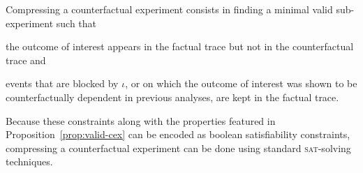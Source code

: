 \noindent Compressing a counterfactual experiment consists in finding
a minimal valid sub-experiment such that
\begin{inparaenum}[(i)]
\item the outcome of interest appears in the factual trace but not in
  the counterfactual trace and
\item events that are blocked by $\iota$, or on which the outcome of
  interest was shown to be counterfactually dependent in previous
  analyses, are kept in the factual trace.
\end{inparaenum}
Because these constraints along with the properties featured in
Proposition~\ref{prop:valid-cex} can be encoded as boolean
satisfiability constraints, compressing a counterfactual experiment
can be done using standard \textsc{sat}-solving techniques.

